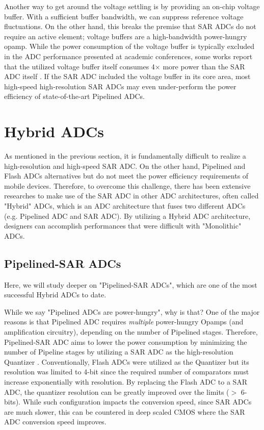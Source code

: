 Another way to get around the voltage settling is by providing an on-chip voltage buffer.
With a sufficient buffer bandwidth, we can suppress reference voltage fluctuations.
On the other hand, this breaks the premise that SAR ADCs do not require an active element; voltage buffers are a high-bandwidth power-hungry opamp.
While the power consumption of the voltage buffer is typically excluded in the ADC performance presented at academic conferences, some works report that the utilized voltage buffer itself consumes 4$\times$ more power than the SAR ADC itself \cite{ccliu201612}. 
If the SAR ADC included the voltage buffer in its core area, most high-speed high-resolution SAR ADCs may even under-perform the power efficiency of state-of-the-art Pipelined ADCs.

\section{Hybrid ADCs}
As mentioned in the previous section, it is fundamentally difficult to realize a high-resolution and high-speed SAR ADC.
On the other hand, Pipelined and Flash ADCs alternatives but do not meet the power efficiency requirements of mobile devices.
Therefore, to overcome this challenge, there has been extensive researches to make use of the SAR ADC in other ADC architectures, 
often called "Hybrid" ADCs, which is an ADC architecture that fuses two different ADCs (e.g. Pipelined ADC and SAR ADC).
By utilizing a Hybrid ADC architecture, designers can accomplish performances that were difficult with "Monolithic" ADCs.

\subsection{Pipelined-SAR ADCs}
Here, we will study deeper on "Pipelined-SAR ADCs", which are one of the most successful Hybrid ADCs to date.

While we say "Pipelined ADCs are power-hungry", why is that?
One of the major reasons is that Pipelined ADC requires \textit{multiple} power-hungry Opamps (and amplification circuitry), depending on the number of Pipelined stages.
Therefore, Pipelined-SAR ADC aims to lower the power consumption by minimizing the number of Pipeline stages by utilizing a SAR ADC as the high-resolution Quantizer \cite{lee2011sar2stagepipeline} \cite{furuta201110}.
Conventionally, Flash ADCs were utilized as the Quantizer but its resolution was limited to 4-bit since the required number of comparators must increase exponentially with resolution. By replacing the Flash ADC to a SAR ADC, the quantizer resolution can be greatly improved over the limits ($>$ 6-bits). While such configuration impacts the conversion speed, since SAR ADCs are much slower, this can be countered in deep scaled CMOS where the SAR ADC conversion speed improves.

